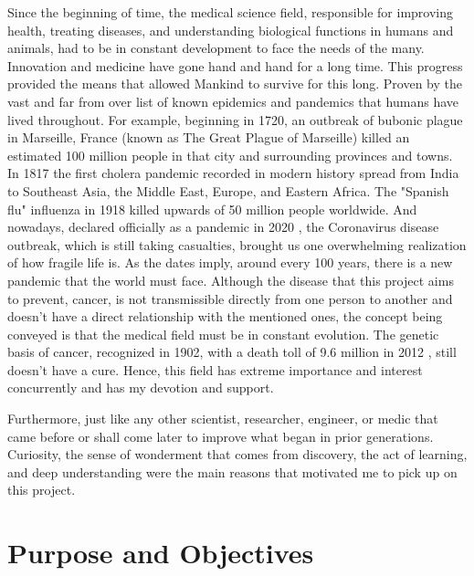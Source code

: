 Since the beginning of time, the medical science field, responsible for improving health, treating diseases, and understanding biological functions in humans and animals, had to be in constant development to face the needs of the many. Innovation and medicine have gone hand and hand for a long time. This progress provided the means that allowed Mankind to survive for this long. Proven by the vast and far from over list of known epidemics and pandemics that humans have lived throughout. For example, beginning in 1720, an outbreak of bubonic plague in Marseille, France (known as The Great Plague of Marseille) killed an estimated 100 million people in that city and surrounding provinces and towns. In 1817 the first cholera pandemic recorded in modern history spread from India to Southeast Asia, the Middle East, Europe, and Eastern Africa. The "Spanish flu" influenza in 1918 killed upwards of 50 million people worldwide. And nowadays, declared officially as a pandemic in 2020 \cite{cdc_covid}, the Coronavirus disease outbreak, which is still taking casualties, brought us one overwhelming realization of how fragile life is. As the dates imply, around every 100 years, there is a new pandemic that the world must face. Although the disease that this project aims to prevent, cancer, is not transmissible directly from one person to another and doesn't have a direct relationship with the mentioned ones, the concept being conveyed is that the medical field must be in constant evolution. The genetic basis of cancer, recognized in 1902, with a death toll of 9.6 million in 2012 \cite{cancer_statistics}, still doesn't have a cure. Hence, this field has extreme importance and interest concurrently and has my devotion and support.

Furthermore, just like any other scientist, researcher, engineer, or medic that came before or shall come later to improve what began in prior generations. Curiosity, the sense of wonderment that comes from discovery, the act of learning, and deep understanding were the main reasons that motivated me to pick up on this project.

\section{Purpose and Objectives}
\label{section:intro-objectives}

